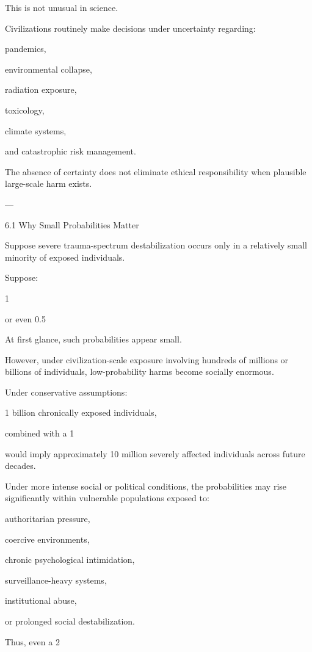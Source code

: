 This is not unusual in science.

Civilizations routinely make decisions under uncertainty regarding:

pandemics,

environmental collapse,

radiation exposure,

toxicology,

climate systems,

and catastrophic risk management.


The absence of certainty does not eliminate ethical responsibility when plausible large-scale harm exists.


---

6.1 Why Small Probabilities Matter

Suppose severe trauma-spectrum destabilization occurs only in a relatively small minority of exposed individuals.

Suppose:

1%

or even 0.5%


At first glance, such probabilities appear small.

However, under civilization-scale exposure involving hundreds of millions or billions of individuals, low-probability harms become socially enormous.

Under conservative assumptions:

1 billion chronically exposed individuals,

combined with a 1%


would imply approximately 10 million severely affected individuals across future decades.

Under more intense social or political conditions, the probabilities may rise significantly within vulnerable populations exposed to:

authoritarian pressure,

coercive environments,

chronic psychological intimidation,

surveillance-heavy systems,

institutional abuse,

or prolonged social destabilization.


Thus, even a 2%

